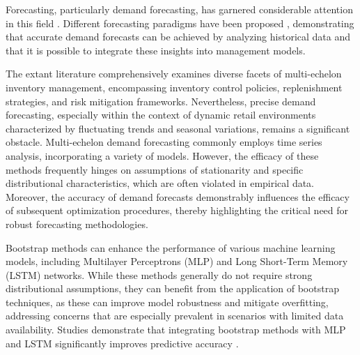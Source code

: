 \documentclass[ijoc,sglanonrev]{informs4}
\begin{document}
Forecasting, particularly demand forecasting, has garnered considerable attention in this field \citep{Shenstone01}. Different forecasting paradigms have been proposed \citep{Syntetos05,Keneley02,Ma15}, demonstrating that accurate demand forecasts can be achieved by analyzing historical data and that it is possible to integrate these insights into management models. 


The extant literature comprehensively examines diverse facets of multi-echelon inventory management, encompassing inventory control policies, replenishment strategies, and risk mitigation frameworks. Nevertheless, precise demand forecasting, especially within the context of dynamic retail environments characterized by fluctuating trends and seasonal variations, remains a significant obstacle. Multi-echelon demand forecasting commonly employs time series analysis, incorporating a variety of models.  However, the efficacy of these methods frequently hinges on assumptions of stationarity and specific distributional characteristics, which are often violated in empirical data. 
Moreover, the accuracy of demand forecasts demonstrably influences the efficacy of subsequent optimization procedures, thereby highlighting the critical need for robust forecasting methodologies. 

Bootstrap methods can enhance the performance of various machine learning models, including Multilayer Perceptrons (MLP) and Long Short-Term Memory (LSTM) networks. While these methods generally do not require strong distributional assumptions, they can benefit from the application of bootstrap techniques, as these can improve model robustness and mitigate overfitting, addressing concerns that are especially prevalent in scenarios with limited data availability. Studies demonstrate that integrating bootstrap methods with MLP and LSTM significantly improves predictive accuracy \citep{efron1994introduction,hastie2009elements,cho2014learning}. 
\end{document}
